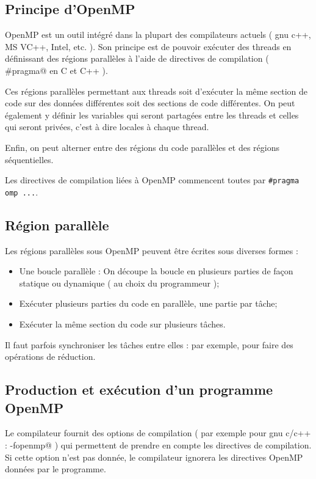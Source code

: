 \documentclass[fleqn,11pt]{article}
\begin{document}
\subsection{Principe d'OpenMP}

OpenMP est un outil intégré dans la plupart des compilateurs actuels ( gnu c++, MS VC++, Intel, etc. ). Son principe est de pouvoir
exécuter des threads en définissant des régions parallèles à l'aide de directives de compilation ( \lstinline@#pragma@ en C et C++ ).

Ces régions parallèles permettant aux threads soit d'exécuter la même section de code sur des données différentes soit des sections de code
différentes. On peut également y définir les variables qui seront partagées entre les threads et celles qui seront privées, c'est à dire
locales à chaque thread.

Enfin, on peut alterner entre des régions du code  parallèles et des régions séquentielles.

Les directives de compilation liées à OpenMP commencent toutes par \lstinline{#pragma omp ...}.

\subsection{Région parallèle}

Les régions parallèles sous OpenMP peuvent être écrites sous diverses formes :
\begin{itemize}
 \item Une boucle parallèle : On découpe la boucle en plusieurs parties de façon statique ou dynamique ( au choix du programmeur );
 \item Exécuter plusieurs parties du code en parallèle, une partie par tâche;
 \item Exécuter la même section du code sur plusieurs tâches.
\end{itemize}

Il faut parfois synchroniser les tâches entre elles : par exemple, pour faire des opérations de réduction.

\subsection{Production et exécution d'un programme OpenMP}

Le compilateur fournit des options de compilation ( par exemple pour gnu c/c++ : \verb@-fopenmp@ ) qui permettent de prendre en compte
les directives de compilation. Si cette option n'est pas donnée, le compilateur ignorera les directives OpenMP données par le programme.
\end{document}
